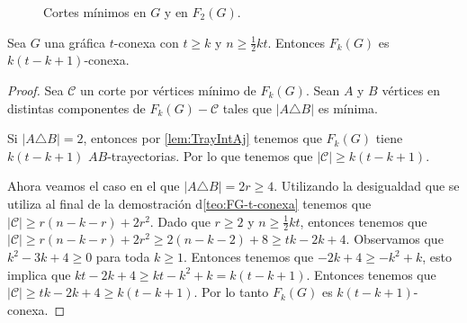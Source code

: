 \begin{figure}[ht!]
    \caption{Cortes m\'inimos en $G$ y en $F_2(G)$.}
    \label{fig:ex-tConect}
    \end{figure}


\begin{teorema}%
    \label{teo:FG_k(t- k+ 1)-conexa}
        Sea $G$ una gr\'afica $t$-conexa con $t \ge k$ y $n \ge \frac{1}{2} kt$.
        Entonces $F_{k}(G)$ es $k (t- k+ 1)$-conexa.
    \end{teorema}

    \begin{proof}
        Sea $\mathcal{C}$ un corte por v\'ertices m\'inimo de $F_k(G)$. Sean
        $A$ y $B$ v\'ertices en distintas componentes de $F_k(G)- \mathcal{C}$
        tales que $|A \triangle B|$ es m\'inima.

        Si $|A \triangle B| = 2$, entonces por \cref{lem:TrayIntAj} tenemos que
        $F_k(G)$ tiene $k (t- k+ 1)$ $AB$-trayectorias. Por lo que tenemos que
        $|\mathcal{C}| \geq k (t- k+ 1)$.

        Ahora veamos el caso en el que $|A \triangle B| = 2r \ge 4$. Utilizando
        la desigualdad que se utiliza al final de la demostraci\'on
        d\cref{teo:FG-t-conexa} tenemos que $|\mathcal{C}| \ge r(n-k-r)+2r^2$. Dado
        que $r \ge 2$ y $n \ge \frac{1}{2}kt$, entonces tenemos que
        $|\mathcal{C}| \ge r(n-k-r)+2r^2 \ge 2 (n- k -2) + 8 \ge tk - 2k+ 4$.
        Observamos que $k^2 -3k + 4 \ge 0$ para toda $k \ge 1$. Entonces tenemos
        que $-2k+4 \ge -k^2 + k$, esto implica que $kt -2k +4 \ge kt - k^2 + k =
        k (t - k +1)$. Entonces tenemos que $|\mathcal{C}| \ge tk -2k +4 \ge
        k(t-k+1)$. Por lo tanto $F_k(G)$ es $k(t-k+1)$-conexa.
    \end{proof}